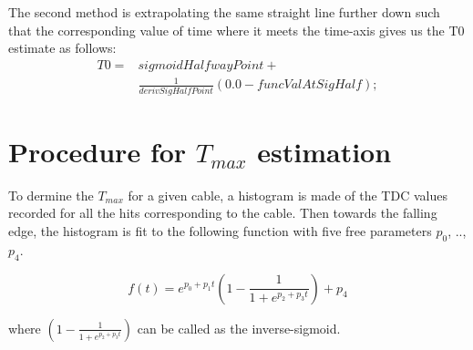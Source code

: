 \documentclass[12pt,epsfig]{article}
\def\tmax{$T_{max}$ }
\begin{document}
The second method is extrapolating the same straight line further down such that the corresponding value of
time where it meets the time-axis gives us the T0 estimate as follows:
\begin{equation}
\label{T0estm2}
\begin{aligned}
   T0  =    &  sigmoidHalfwayPoint + \\
            & \frac{1}{derivSigHalfPoint} (0.0 - funcValAtSigHalf);
\end{aligned}
\end{equation}

\section{Procedure for \tmax estimation}
To dermine the \tmax for a given cable, a histogram is made of the TDC values recorded for all the hits corresponding to the cable. Then towards the falling edge, the histogram is fit to the following function with five free parameters $p_0$, .., $p_4$.

\begin{equation}
    \label{T0fit}
    f(t) = e^{p_0 + p_1t} (1 - \frac{1}{1 + e^{p_2 + p_3t}})  + p_4
\end{equation}

where $(1 - \frac{1}{1 + e^{p_2 + p_3t}})$ can be called as the inverse-sigmoid.
\end{document}
